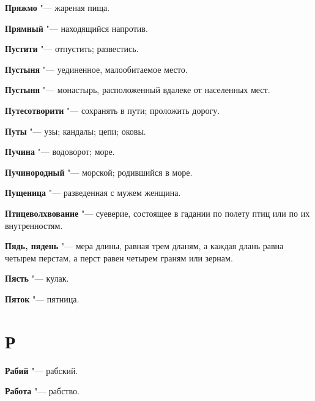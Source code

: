 \begin{mymulticols}{2}
\noindent\textbf{Пряжмо} "--- жареная пища. 




\noindent\textbf{Прямный} "--- находящийся напротив. 




\noindent\textbf{Пустити} "--- отпустить; развестись. 




\noindent\textbf{Пустыня} "--- уединенное, малообитаемое место. 




\noindent\textbf{Пустыня} "--- монастырь, расположенный вдалеке от населенных мест. 




\noindent\textbf{Путесотворити} "--- сохранять в пути; проложить дорогу. 




\noindent\textbf{Путы} "--- узы; кандалы; цепи; оковы. 




\noindent\textbf{Пучина} "--- водоворот; море. 




\noindent\textbf{Пучинородный} "--- морской; родившийся в море. 




\noindent\textbf{Пущеница} "--- разведенная с мужем женщина. 




\noindent\textbf{Птицеволхвование} "--- суеверие, состоящее в гадании по полету птиц или по их внутренностям. 




\noindent\textbf{Пядь, пядень} "--- мера длины, равная трем дланям, а каждая длань равна четырем перстам, а перст равен четырем граням или зернам. 




\noindent\textbf{Пясть} "--- кулак. 




\noindent\textbf{Пяток} "--- пятница. 




\section{Р}





\noindent\textbf{Рабий} "--- рабский. 




\noindent\textbf{Работа} "--- рабство. 





\end{mymulticols}
